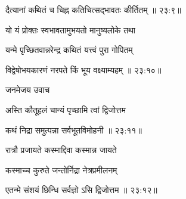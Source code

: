 

\nemslokad

{\devanagarifont दैत्यानां कथितं च चिह्न कतिचित्सद्भावतः कीर्तितम् {॥ २३:९॥} \veg\dontdisplaylinenum }%

\ujvers{}

\nemslokab

{\devanagarifont यो यं प्रोक्तः स्वभावतामुभयतो मानुष्यलोके तथा  \danda\dontdisplaylinenum }%

\nemslokac

{\devanagarifont यन्मे पृच्छितवान्नरेन्द्र कथितं यत्त्वं पुरा गोपितम् }%
  \dontdisplaylinenum    {}%



\nemslokad

{\devanagarifont विद्वेषोभयकारणं नरपते किं भूय वक्ष्याम्यहम् {॥ २३:१०॥} \veg\dontdisplaylinenum }%


\vers


{\devanagarifont जनमेजय उवाच {\dandab}\dontdisplaylinenum  }%
 
{\devanagarifont अस्ति कौतूहलं चान्यं पृच्छामि त्वां द्विजोत्तम \thinspace{\danda} \dontdisplaylinenum }%


{\devanagarifont कथं निद्रा समुत्पन्ना सर्वभूतविमोहनी {॥ २३:११॥} \veg\dontdisplaylinenum }%

{\devanagarifont रात्रौ प्रजायते कस्माद्दिवा कस्मान्न जायते \thinspace{\dandab} \dontdisplaylinenum }%
 
{\devanagarifont कस्माच्च कुरुते जन्तोर्निद्रा नेत्रप्रमीलनम्  \danda\dontdisplaylinenum }%


{\devanagarifont एतन्मे संशयं छिन्धि सर्वज्ञो ऽसि द्विजोत्तम {॥ २३:१२॥} \veg\dontdisplaylinenum }%

